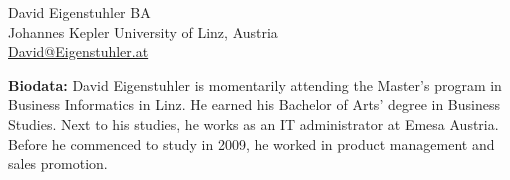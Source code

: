 \pagestyle{empty}
\parindent0mm

David Eigenstuhler BA\\
Johannes Kepler University of Linz, Austria\\
\href{mailto:david@eigenstuhler.at}{David@Eigenstuhler.at}\\
\vspace{4mm}

\textbf{Biodata: } David Eigenstuhler is momentarily attending the Master's program in Business Informatics in Linz. He earned his Bachelor of Arts' degree 
in Business Studies. Next to his studies, he works as an IT administrator at Emesa Austria. Before he commenced to study in 2009, 
he worked in product management and sales promotion.
